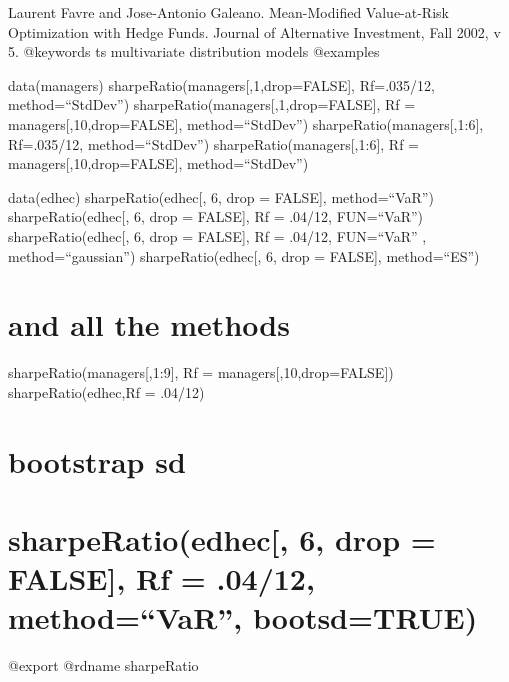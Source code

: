 \documentclass[
]{article}
\begin{document}
Laurent Favre and Jose-Antonio Galeano. Mean-Modified Value-at-Risk
Optimization with Hedge Funds. Journal of Alternative Investment, Fall
2002, v 5. @keywords ts multivariate distribution models @examples

data(managers) sharpeRatio(managers{[},1,drop=FALSE{]}, Rf=.035/12,
method=``StdDev'') sharpeRatio(managers{[},1,drop=FALSE{]}, Rf =
managers{[},10,drop=FALSE{]}, method=``StdDev'')
sharpeRatio(managers{[},1:6{]}, Rf=.035/12, method=``StdDev'')
sharpeRatio(managers{[},1:6{]}, Rf = managers{[},10,drop=FALSE{]},
method=``StdDev'')

data(edhec) sharpeRatio(edhec{[}, 6, drop = FALSE{]}, method=``VaR'')
sharpeRatio(edhec{[}, 6, drop = FALSE{]}, Rf = .04/12, FUN=``VaR'')
sharpeRatio(edhec{[}, 6, drop = FALSE{]}, Rf = .04/12, FUN=``VaR'' ,
method=``gaussian'') sharpeRatio(edhec{[}, 6, drop = FALSE{]},
method=``ES'')

\hypertarget{and-all-the-methods}{%
\section{and all the methods}\label{and-all-the-methods}}

sharpeRatio(managers{[},1:9{]}, Rf = managers{[},10,drop=FALSE{]})
sharpeRatio(edhec,Rf = .04/12)

\hypertarget{bootstrap-sd}{%
\section{bootstrap sd}\label{bootstrap-sd}}

\hypertarget{sharperatioedhec-6-drop-false-rf-.0412-methodvar-bootsdtrue}{%
\section{sharpeRatio(edhec{[}, 6, drop = FALSE{]}, Rf = .04/12,
method=``VaR'',
bootsd=TRUE)}\label{sharperatioedhec-6-drop-false-rf-.0412-methodvar-bootsdtrue}}

@export @rdname sharpeRatio
\end{document}
